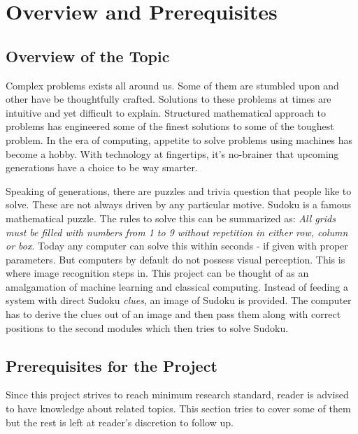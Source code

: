 \documentclass[12pt, a4paper]{report}
\begin{document}
\chapter{Overview and Prerequisites}
\label{chap:overview}
\thispagestyle{fancy}

\section{Overview of the Topic}
\label{sec:ovrtpc}

\hspace{0.5cm} Complex problems exists all around us. Some of them are stumbled upon and other have be thoughtfully crafted. Solutions to these problems at times are intuitive and yet difficult to explain. Structured mathematical approach to problems has engineered some of the finest solutions to some of the toughest problem. In the era of computing, appetite to solve problems using machines has become a hobby. With technology at fingertips, it's no-brainer that upcoming generations have a choice to be way smarter.

Speaking of generations, there are puzzles and trivia question that people like to solve. These are not always driven by any particular motive. Sudoku is a famous mathematical puzzle. The rules to solve this can be summarized as: \emph{All grids must be filled with numbers from 1 to 9 without repetition in either row, column or box}. Today any computer can solve this within seconds - if given with proper parameters. But computers by default do not possess visual perception. This is where image recognition steps in. This project can be thought of as an amalgamation of machine learning and classical computing. Instead of feeding a system with direct Sudoku \emph{clues}, an image of Sudoku is provided. The computer has to derive the clues out of an image and then pass them along with correct positions to the second modules which then tries to solve Sudoku.

\section{Prerequisites for the Project}
\label{sec:prereq}

\hspace{0.5cm} Since this project strives to reach minimum research standard, reader is advised to have knowledge about related topics. This section tries to cover some of them but the rest is left at reader's discretion to follow up.
\end{document}
